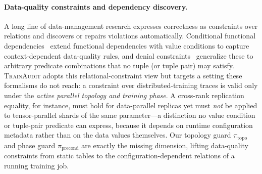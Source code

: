 
\paragraph{Data-quality constraints and dependency discovery.}
A long line of data-management research expresses correctness as constraints over relations and discovers or repairs violations automatically. Conditional functional dependencies~\cite{fan2008cfd} extend functional dependencies with value conditions to capture context-dependent data-quality rules, and denial constraints~\cite{chu2013discovering} generalize these to arbitrary predicate combinations that no tuple (or tuple pair) may satisfy. \textsc{TrainAudit} adopts this relational-constraint view but targets a setting these formalisms do not reach: a constraint over distributed-training traces is valid only under the \emph{active parallel topology and training phase}. A cross-rank replication equality, for instance, must hold for data-parallel replicas yet must \emph{not} be applied to tensor-parallel shards of the same parameter---a distinction no value condition or tuple-pair predicate can express, because it depends on runtime configuration metadata rather than on the data values themselves. Our topology guard $\pi_{\text{topo}}$ and phase guard $\pi_{\text{precond}}$ are exactly the missing dimension, lifting data-quality constraints from static tables to the configuration-dependent relations of a running training job.

